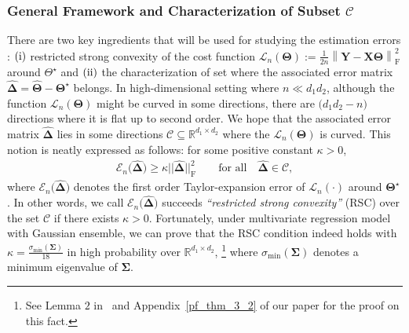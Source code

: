 \documentclass[alpha-refs]{wiley-article}
\newcommand{\RN}[1]{ \textup{\uppercase\expandafter{\romannumeral#1}} }
\begin{document}
\subsubsection{General Framework and Characterization of Subset $\mathcal{C}$} \label{GF}
There are two key ingredients that will be used for studying the estimation errors : $(\RN{1})$ restricted strong convexity of the cost function $\mathcal{L}_{n}(\boldsymbol{\Theta}):= \frac{1}{2n} \left\| \boldsymbol{Y}-\boldsymbol{X}\boldsymbol{\Theta} \right\|_{\text{F}}^{2}$ around $\Theta^\star$ and
$(\RN{2})$ the characterization of set where the associated error matrix $\boldsymbol{\widehat{\Delta}}=\widehat{\boldsymbol{\Theta}}-\boldsymbol{\Theta^{\star}}$ belongs.
In high-dimensional setting where $n \ll d_{1}d_{2}$, although the function $\mathcal{L}_{n}(\boldsymbol{\Theta})$ might be curved in some directions, there are $\big(d_{1}d_{2}-n\big)$ directions where it is flat up to second order.
We hope that the associated error matrix $\boldsymbol{\widehat{\Delta}}$
lies in some directions $\mathcal{C}\subseteq \mathbb{R}^{d_{1}\times d_{2}}$ where the $\mathcal{L}_{n}(\boldsymbol{\Theta})$ is curved.
This notion is neatly expressed as follows: for some positive constant $\kappa>0$,
\begin{align} \label{RSC}
    \mathcal{E}_{n}\big(\boldsymbol{\widehat{\Delta}})\geq \kappa || \boldsymbol{\widehat{\Delta}} ||_{\text{F}}^{2} \qquad \text{for all} \quad \boldsymbol{\widehat{\Delta}}\in\mathcal{C},
\end{align}
where $\mathcal{E}_{n}\big(\boldsymbol{\widehat{\Delta}})$ denotes the first order Taylor-expansion error of $\mathcal{L}_{n}(\cdot)$ around $\boldsymbol{\Theta}^\star$.
In other words, we call $\mathcal{E}_{n}\big(\boldsymbol{\widehat{\Delta}})$ succeeds \textit{``restricted strong convexity''} (RSC) over the set $\mathcal{C}$ if there exists $\kappa>0$.
Fortunately, under multivariate regression model with Gaussian ensemble, we can prove that the RSC condition indeed holds with $\kappa=\frac{\sigma_{\text{min}}(\boldsymbol{\Sigma})}{18}$ in high probability over $\mathbb{R}^{d_{1} \times d_{2}}$,
\footnote{See Lemma $2$ in~\citet{negahban2011estimation} and Appendix~\ref{pf_thm_3_2} of our paper for the proof on this fact.} where $\sigma_{\text{min}}(\boldsymbol{\Sigma})$ denotes a minimum eigenvalue of $\boldsymbol{\Sigma}$.
\end{document}
